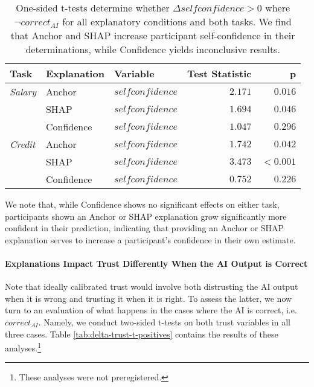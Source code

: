 \begin{table}[htb]
    \centering
    \caption{One-sided t-tests determine whether $\Delta selfconfidence > 0$ where $\neg correct_{AI}$ for all explanatory conditions and both tasks. We find that Anchor and SHAP increase participant self-confidence in their determinations, while Confidence yields inconclusive results.}
    \label{tab:delta-confidence-t}
    \begin{tabular}{lllrr}
        \toprule
        Task & Explanation & Variable & Test Statistic & p \\
        \midrule
        \emph{Salary} & Anchor & $selfconfidence$ & $\mathbf{2.171}$ & $\mathbf{0.016}$ \\
        & SHAP & $selfconfidence$ & $\mathbf{1.694}$ & $\mathbf{0.046}$ \\
        & Confidence & $selfconfidence$ & $1.047$ & $0.296$ \\
        \midrule
        \emph{Credit} & Anchor & $selfconfidence$ & $\mathbf{1.742}$ & $\mathbf{0.042}$ \\
        & SHAP & $selfconfidence$ & $\mathbf{3.473}$ & $\mathbf{<0.001}$ \\
        & Confidence & $selfconfidence$ & $0.752$ & $0.226$ \\
        \bottomrule
    \end{tabular}
\end{table}

We note that, while Confidence shows no significant effects on either task, participants shown an Anchor or SHAP explanation grow significantly more confident in their prediction, indicating that providing an Anchor or SHAP explanation serves to increase a participant's confidence in their own estimate.

\paragraph{Explanations Impact Trust Differently When the AI Output is Correct}
Note that ideally calibrated trust would involve both distrusting the AI output when it is wrong and trusting it when it is right. To assess the latter, we now turn to an evaluation of what happens in the cases where the AI is correct, i.e. $correct_{AI}$. Namely, we conduct two-sided t-tests on both trust variables in all three cases. Table \ref{tab:delta-trust-t-positives} contains the results of these analyses.\footnote{These analyses were not preregistered.}

